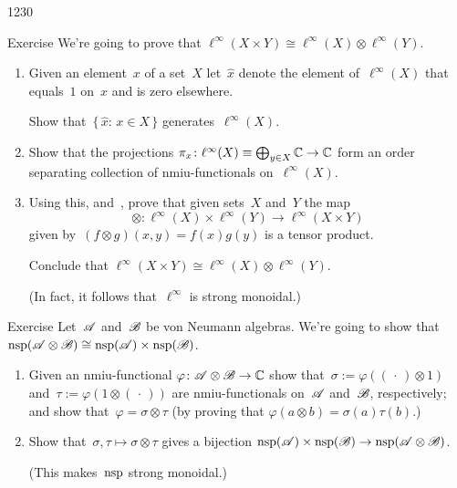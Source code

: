 \begin{parsec}{1230}
\begin{point}{10}{Exercise}%
	We're going to prove that
	$\ell^\infty(X\times Y)\cong \ell^\infty(X)\otimes \ell^\infty(Y)$.
\begin{enumerate}%
\item
Given an element~$x$ of a set~$X$
let~$\hat{x}$ denote
the element of~$\ell^\infty(X)$
that equals~$1$ on~$x$ and is zero elsewhere.

Show that~$\{\,\hat{x}\colon\, x\in X\,\}$
generates~$\ell^\infty(X)$.
\item
Show that the  projections $\pi_x\colon \ell^\infty(X)\equiv
\bigoplus_{y\in X}\mathbb{C}\to\mathbb{C}$
form an order separating collection of
		nmiu-functionals on~$\ell^\infty(X)$.
\item
Using this, and~,
prove that given sets~$X$ and~$Y$
the map
\begin{equation*}
	\otimes\colon \ell^\infty(X)\times \ell^\infty(Y)
\to\ell^\infty(X\times Y)
\end{equation*}
given by~$(f\otimes g)(x,y)=f(x)g(y)$
is a tensor product.

Conclude that 
	$\ell^\infty(X\times Y)\cong \ell^\infty(X)\otimes \ell^\infty(Y)$.

		(In fact, it follows that~$\ell^\infty$ is strong monoidal.)
\end{enumerate}
\spacingfix%
\end{point}%
\begin{point}{20}{Exercise}%
Let~$\mathscr{A}$ and~$\mathscr{B}$
be von Neumann algebras.
We're going to show that~$\mathrm{nsp}(\mathscr{A}\otimes\mathscr{B})\cong \mathrm{nsp}(\mathscr{A})\times
	\mathrm{nsp}(\mathscr{B})$.
\begin{enumerate}
\item
Given an nmiu-functional $\varphi\colon \mathscr{A}\otimes \mathscr{B}\to\mathbb{C}$
show that~$\sigma:= \varphi((\,\cdot\,)\otimes 1)$
and~$\tau:=\varphi(1\otimes (\,\cdot\,))$
are nmiu-functionals on~$\mathscr{A}$ and~$\mathscr{B}$, respectively;
		and show that~$\varphi=\sigma\otimes \tau$
		(by proving that $\varphi(a\otimes b)=\sigma(a)\tau(b)$.)
\item
Show that~$\sigma,\tau\mapsto \sigma\otimes \tau$
		gives a bijection $\mathrm{nsp}(\mathscr{A})\times\mathrm{nsp}(\mathscr{B})
		\to\mathrm{nsp}(\mathscr{A}\otimes\mathscr{B})$.

		(This  makes~$\mathrm{nsp}$  strong monoidal.)
\end{enumerate}
\spacingfix%
\end{point}%
\end{parsec}%
